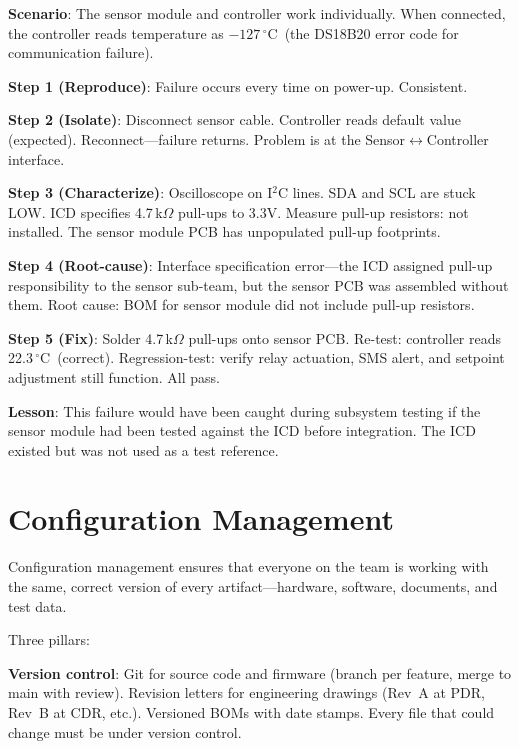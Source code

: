 \documentclass[11pt,letterpaper,twoside,openany]{book}
\newcommand{\degC}{\ensuremath{{}^{\circ}\text{C}}}
\begin{document}
\begin{keyconceptbox}
\textbf{Scenario}: The sensor module and controller work individually. When connected, the controller reads temperature as $-127$\,\degC\ (the DS18B20 error code for communication failure).

\textbf{Step 1 (Reproduce)}: Failure occurs every time on power-up. Consistent.

\textbf{Step 2 (Isolate)}: Disconnect sensor cable. Controller reads default value (expected). Reconnect---failure returns. Problem is at the Sensor$\leftrightarrow$Controller interface.

\textbf{Step 3 (Characterize)}: Oscilloscope on I$^2$C lines. SDA and SCL are stuck LOW. ICD specifies 4.7\,k$\Omega$ pull-ups to 3.3V. Measure pull-up resistors: not installed. The sensor module PCB has unpopulated pull-up footprints.

\textbf{Step 4 (Root-cause)}: Interface specification error---the ICD assigned pull-up responsibility to the sensor sub-team, but the sensor PCB was assembled without them. Root cause: BOM for sensor module did not include pull-up resistors.

\textbf{Step 5 (Fix)}: Solder 4.7\,k$\Omega$ pull-ups onto sensor PCB. Re-test: controller reads 22.3\,\degC\ (correct). Regression-test: verify relay actuation, SMS alert, and setpoint adjustment still function. All pass.

\textbf{Lesson}: This failure would have been caught during subsystem testing if the sensor module had been tested against the ICD before integration. The ICD existed but was not used as a test reference.
\end{keyconceptbox}

\FloatBarrier
\section{Configuration Management}
Configuration management ensures that everyone on the team is working with the same, correct version of every artifact---hardware, software, documents, and test data.

Three pillars:

\textbf{Version control}: Git for source code and firmware (branch per feature, merge to main with review). Revision letters for engineering drawings (Rev~A at PDR, Rev~B at CDR, etc.). Versioned BOMs with date stamps. Every file that could change must be under version control.
\end{document}
